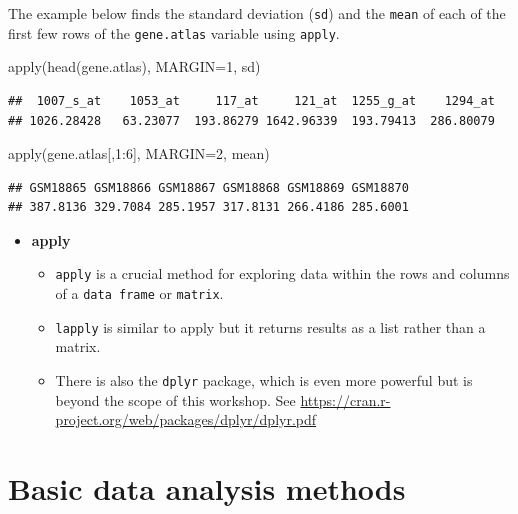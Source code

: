 \documentclass[a4paper]{book}
\newenvironment{Shaded}{}{}
\newcommand{\KeywordTok}[1]{\textcolor[rgb]{0.00,0.00,1.00}{{#1}}}
\newcommand{\DataTypeTok}[1]{{#1}}
\newcommand{\DecValTok}[1]{{#1}}
\newcommand{\NormalTok}[1]{{#1}}
\newlength{\leftbarwidth}
\newlength{\leftbarsep}
\newcommand*{\leftbarcolorcmd}{\color{darkgray}}%
\renewenvironment{leftbar}{%
    \def\FrameCommand{{\leftbarcolorcmd{\vrule width \leftbarwidth\relax\hspace {\leftbarsep}}}}%
    \MakeFramed {\advance \hsize -\width \FrameRestore }%
}{%
    \endMakeFramed
}
\renewenvironment{Shaded}
{\vspace{0em}\begin{leftbar}\begin{snugshade}}
{\end{snugshade}\end{leftbar}\vspace{0pt}}
\newenvironment{rmdblock}[1]
  {\vspace{1.5em}\begin{shaded*}
  \begin{itemize}
  \renewcommand{\labelitemi}{
    \raisebox{-.7\height}[0pt][0pt]{
      {\setkeys{Gin}{width=3em,keepaspectratio}\texttt{[image: images/\#1]}}
    }
  }
  \item
  }
  {
  \end{itemize}
  \end{shaded*}
  }
\newenvironment{rmdtip}
  {\begin{rmdblock}{tip}}
  {\end{rmdblock}}
\begin{document}
The example below finds the standard deviation (\texttt{sd}) and the
\texttt{mean} of each of the first few rows of the \texttt{gene.atlas}
variable using \texttt{apply}.

\begin{Shaded}
\begin{Highlighting}[]
\KeywordTok{apply}\NormalTok{(}\KeywordTok{head}\NormalTok{(gene.atlas), }\DataTypeTok{MARGIN=}\DecValTok{1}\NormalTok{, sd)}
\end{Highlighting}
\end{Shaded}

\begin{verbatim}
##  1007_s_at    1053_at     117_at     121_at  1255_g_at    1294_at 
## 1026.28428   63.23077  193.86279 1642.96339  193.79413  286.80079
\end{verbatim}

\begin{Shaded}
\begin{Highlighting}[]
\KeywordTok{apply}\NormalTok{(gene.atlas[,}\DecValTok{1}\NormalTok{:}\DecValTok{6}\NormalTok{], }\DataTypeTok{MARGIN=}\DecValTok{2}\NormalTok{, mean)}
\end{Highlighting}
\end{Shaded}

\begin{verbatim}
## GSM18865 GSM18866 GSM18867 GSM18868 GSM18869 GSM18870 
## 387.8136 329.7084 285.1957 317.8131 266.4186 285.6001
\end{verbatim}

\begin{rmdtip}
\textbf{apply}

\begin{itemize}
\item
  \texttt{apply} is a crucial method for exploring data within the rows
  and columns of a \texttt{data\ frame} or \texttt{matrix}.
\item
  \texttt{lapply} is similar to apply but it returns results as a list
  rather than a matrix.
\item
  There is also the \texttt{dplyr} package, which is even more powerful
  but is beyond the scope of this workshop. See
  \url{https://cran.r-project.org/web/packages/dplyr/dplyr.pdf}
\end{itemize}
\end{rmdtip}

\section{Basic data analysis methods}\label{basic-data-analysis-methods}
\end{document}
